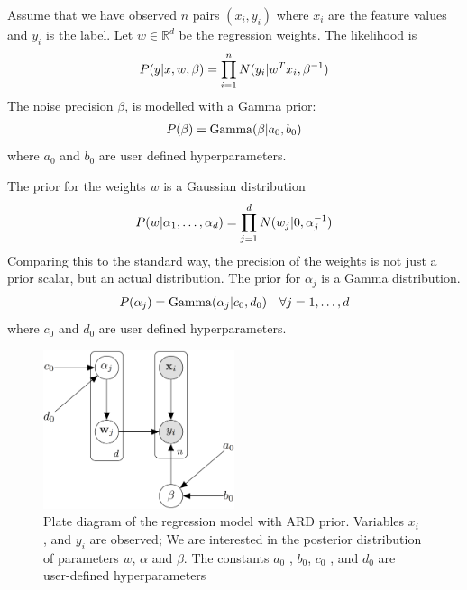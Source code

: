 \documentclass[12pt]{article}
\begin{document}
    \vspace{5mm}
    Assume that we have observed $n$ pairs $(x_i, y_i)$ where $x_i$ are the feature values and $y_i$ is the label. Let $w \in \mathbb{R}^d$ be the regression weights. The likelihood is 
    \begin{align}
        P(y|x,w,\beta) = \prodlim{1}{n} N(y_i|w^Tx_i,\beta^{-1}) \label{eq:likelihood}
    \end{align}
    The noise precision $\beta$, is modelled with a Gamma prior:
    \begin{align}
        P(\beta) = \opGamma(\beta|a_0,b_0) \label{eq:betaprior}
    \end{align}
    where $a_0$ and $b_0$ are user defined hyperparameters.

    The prior for the weights $w$ is a Gaussian distribution
    \begin{align}
        P(w|\alpha_1, \ldots, \alpha_d) = \prodlim[j]{1}{d} N(w_j|0,\alpha_j^{-1}) \label{eq:wprior}
    \end{align}
    Comparing this to the standard way, the precision of the weights is not just a prior scalar, but an actual distribution. The prior for $\alpha_j$ is a Gamma distribution.
    \begin{align}
        P(\alpha_j) = \opGamma(\alpha_j|c_0,d_0) \quad \forall j = 1, \ldots, d \label{eq:alphaprior}
    \end{align}
    where $c_0$ and $d_0$ are user defined hyperparameters. 

    \begin{figure}[H] 
        \centering
        \includegraphics[width=0.5\textwidth]{bn_network.png} 
        \caption{Plate diagram of the regression model with ARD prior. Variables $x_i$ , and $y_i$ are observed; We are interested in the posterior distribution of parameters $w$, $\alpha$ and $\beta$. The constants $a_0$ , $b_0$, $c_0$ , and $d_0$ are user-defined hyperparameters}
        \label{fig:diagram}
    \end{figure}
\end{document}
